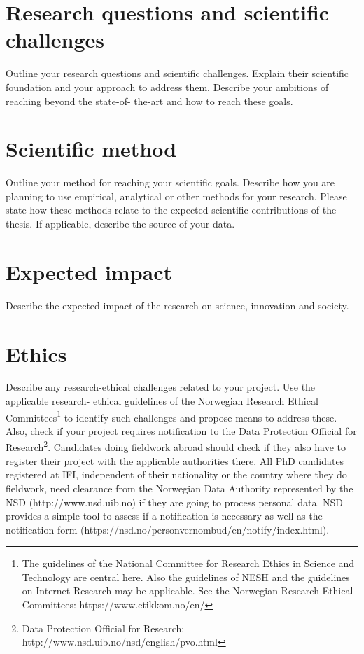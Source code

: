 \documentclass{scrarticle}
\begin{document}
\section{Research questions and scientific challenges}

Outline your research questions and scientific challenges. Explain their scientific foundation and your approach to address them. Describe your ambitions of reaching beyond the state-of- the-art and how to reach these goals.

\section{Scientific method}

Outline your method for reaching your scientific goals. Describe how you are planning to use empirical, analytical or other methods for your research. Please state how these methods relate to the expected scientific contributions of the thesis. If applicable, describe the source of your data.

\section{Expected impact}

Describe the expected impact of the research on science, innovation and society.

\section{Ethics}

Describe any research-ethical challenges related to your project. Use the applicable research- ethical guidelines of the Norwegian Research Ethical Committees\footnote{The guidelines of the National Committee for Research Ethics in Science and Technology are central here. Also the guidelines of NESH and the guidelines on Internet Research may be applicable. See the Norwegian Research Ethical Committees: https://www.etikkom.no/en/} to identify such challenges and propose means to address these. Also, check if your project requires notification to the Data Protection Official for Research\footnote{Data Protection Official for Research: http://www.nsd.uib.no/nsd/english/pvo.html}. Candidates doing fieldwork abroad should check if they also have to register their project with the applicable authorities there. All PhD candidates registered at IFI, independent of their nationality or the country where they do fieldwork, need clearance from the Norwegian Data Authority represented by the NSD (http://www.nsd.uib.no) if they are going to process personal data. NSD provides a simple tool to assess if a notification is necessary as well as the notification form (https://nsd.no/personvernombud/en/notify/index.html).
\end{document}
